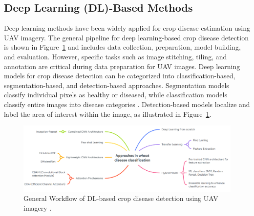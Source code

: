 \begin{table}[htbp]
    \caption{Summary of conventional ML methods for wheat disease estimation.}
    \centering
    \label{tab:summaryML}
\end{table}


\subsection{Deep Learning (DL)-Based Methods}

Deep learning methods have been widely applied for crop disease estimation using UAV imagery. The general pipeline for deep learning-based crop disease detection is shown in Figure~\ref{fig:DLBased} and includes data collection, preparation, model building, and evaluation. However, specific tasks such as image stitching, tiling, and annotation are critical during data preparation for UAV images. Deep learning models for crop disease detection can be categorized into classification-based, segmentation-based, and detection-based approaches. Segmentation models classify individual pixels as healthy or diseased, while classification models classify entire images into disease categories \parencite{shahi2023recent}. Detection-based models localize and label the area of interest within the image, as illustrated in Figure~\ref{fig:DLBased}.

\begin{figure}[H]
    \centering
    \includegraphics[width=0.8
    \textwidth]{chapters/chapter3/images/Figure09.png}
    \caption{General Workflow of DL-based crop disease detection using UAV imagery \parencite{shahi2023recent}.}
    \label{fig:DLBased}
\end{figure}

